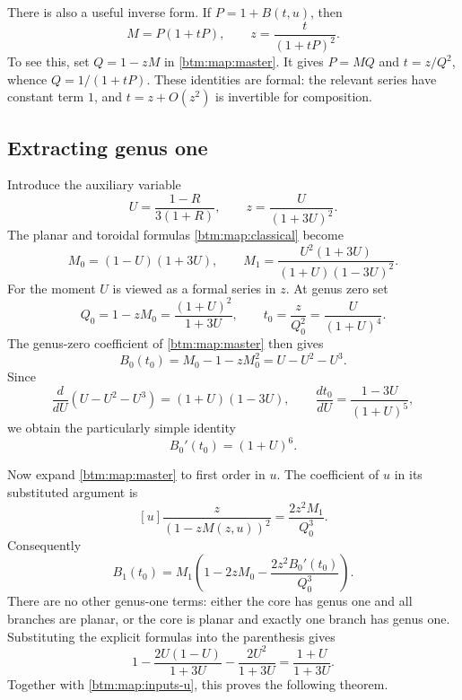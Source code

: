 \documentclass[11pt,letterpaper]{article}
\numberwithin{equation}{section}
\theoremstyle{definition}
\theoremstyle{remark}
\begin{document}
There is also a useful inverse form.  If $P=1+B(t,u)$, then
\begin{equation}
 \label{btm:map:inverse}
 M=P(1+tP),\qquad z=\frac{t}{(1+tP)^2}.
\end{equation}
To see this, set $Q=1-zM$ in \eqref{btm:map:master}.  It gives $P=MQ$ and
$t=z/Q^2$, whence $Q=1/(1+tP)$.  These identities are formal: the relevant
series have constant term $1$, and $t=z+O(z^2)$ is invertible for
composition.

\subsection{Extracting genus one}
\label{btm:map:extract}

Introduce the auxiliary variable
\begin{equation}
 \label{btm:map:parameter}
 U=\frac{1-R}{3(1+R)},\qquad
 z=\frac{U}{(1+3U)^2}.
\end{equation}
The planar and toroidal formulas \eqref{btm:map:classical} become
\begin{equation}
 \label{btm:map:inputs-u}
 M_0=(1-U)(1+3U),\qquad
 M_1=\frac{U^2(1+3U)}{(1+U)(1-3U)^2}.
\end{equation}
For the moment $U$ is viewed as a formal series in $z$.  At genus zero set
\[
 Q_0=1-zM_0=\frac{(1+U)^2}{1+3U},\qquad
 t_0=\frac{z}{Q_0^2}=\frac{U}{(1+U)^4}.
\]
The genus-zero coefficient of \eqref{btm:map:master} then gives
\begin{equation}
 \label{btm:map:planar}
 B_0(t_0)=M_0-1-zM_0^2=U-U^2-U^3.
\end{equation}
Since
\[
 \frac{d}{dU}(U-U^2-U^3)=(1+U)(1-3U),\qquad
 \frac{dt_0}{dU}=\frac{1-3U}{(1+U)^5},
\]
we obtain the particularly simple identity
\begin{equation}
 \label{btm:map:b0-derivative}
 B_0'(t_0)=(1+U)^6.
\end{equation}

Now expand \eqref{btm:map:master} to first order in $u$.  The coefficient of
$u$ in its substituted argument is
\[
 [u]\frac{z}{(1-zM(z,u))^2}=\frac{2z^2M_1}{Q_0^3}.
\]
Consequently
\begin{equation}
 \label{btm:map:linear-genus}
 B_1(t_0)=M_1\left(1-2zM_0-
          \frac{2z^2B_0'(t_0)}{Q_0^3}\right).
\end{equation}
There are no other genus-one terms: either the core has genus one and all
branches are planar, or the core is planar and exactly one branch has
genus one.  Substituting the explicit formulas into the parenthesis gives
\[
 1-\frac{2U(1-U)}{1+3U}-\frac{2U^2}{1+3U}
 =\frac{1+U}{1+3U}.
\]
Together with \eqref{btm:map:inputs-u}, this proves the following theorem.
\end{document}
